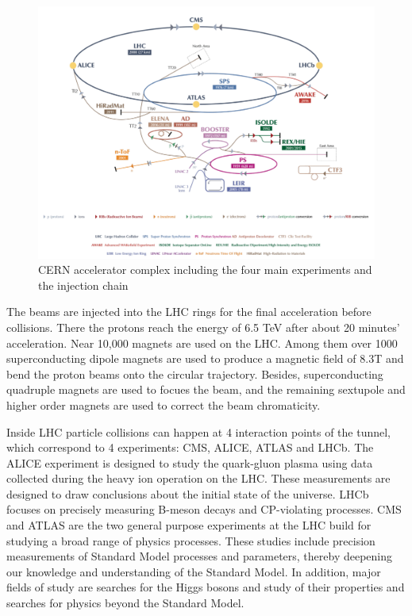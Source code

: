 \begin{figure}[htbp]
\begin{center}
\includegraphics[width=0.72\linewidth]{figures/lhc_lhc.pdf}
\caption{CERN accelerator complex including the four main experiments and the injection chain}
\label{fig:lhc_lhc}
\end{center}
\end{figure}

\vspace{0.3cm}
The beams are injected into the LHC rings for the final acceleration before collisions. There the protons reach the energy of 6.5 TeV after about 20 minutes' acceleration. Near 10,000 magnets are used on the LHC. Among them over 1000 superconducting dipole magnets are used to produce a magnetic field of 8.3T and bend the proton beams onto the circular trajectory. Besides, superconducting quadruple magnets are used to focues the beam, and the remaining sextupole and higher order magnets are used to correct the beam chromaticity.

\vspace{0.3cm}
Inside LHC particle collisions can happen at 4 interaction points of the tunnel, which correspond to 4 experiments: CMS, ALICE, ATLAS and LHCb. The ALICE experiment is designed to study the quark-gluon plasma using data collected during the heavy ion operation on the LHC. These measurements are designed to draw conclusions about the initial state of the universe. LHCb focuses on precisely measuring B-meson decays and CP-violating processes. CMS and ATLAS are the two general purpose experiments at the LHC build for studying a broad range of physics processes. These studies include precision measurements of Standard Model processes and parameters, thereby deepening our knowledge and understanding of the Standard Model. In addition, major fields of study are searches for the Higgs bosons and study of their properties and searches for physics beyond the Standard Model.

